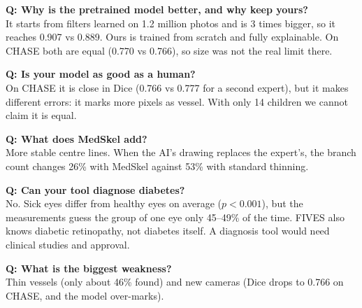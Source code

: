 \documentclass[11pt,a4paper]{article}
\begin{document}
\begin{prof}\textbf{Q: Why is the pretrained model better, and why keep yours?}\\
It starts from filters learned on 1.2 million photos and is 3 times bigger, so it reaches 0.907 vs 0.889. Ours is trained from scratch and fully explainable. On CHASE both are equal (0.770 vs 0.766), so size was not the real limit there.\end{prof}

\begin{prof}\textbf{Q: Is your model as good as a human?}\\
On CHASE it is close in Dice (0.766 vs 0.777 for a second expert), but it makes different errors: it marks more pixels as vessel. With only 14 children we cannot claim it is equal.\end{prof}

\begin{prof}\textbf{Q: What does MedSkel add?}\\
More stable centre lines. When the AI's drawing replaces the expert's, the branch count changes 26\% with MedSkel against 53\% with standard thinning.\end{prof}

\begin{prof}\textbf{Q: Can your tool diagnose diabetes?}\\
No. Sick eyes differ from healthy eyes on average ($p < 0.001$), but the measurements guess the group of one eye only 45--49\% of the time. FIVES also knows diabetic retinopathy, not diabetes itself. A diagnosis tool would need clinical studies and approval.\end{prof}

\begin{prof}\textbf{Q: What is the biggest weakness?}\\
Thin vessels (only about 46\% found) and new cameras (Dice drops to 0.766 on CHASE, and the model over-marks).\end{prof}

\end{document}
